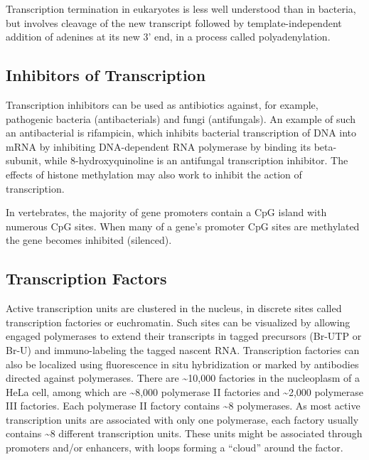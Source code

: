Transcription termination in eukaryotes is less well understood than in bacteria, but involves cleavage of the new transcript followed by template-independent addition of adenines at its new 3' end, in a process called polyadenylation.

\hypertarget{inhibitors-of-transcription}{%
\subsection{Inhibitors of Transcription}\label{inhibitors-of-transcription}}

Transcription inhibitors can be used as antibiotics against, for example, pathogenic bacteria (antibacterials) and fungi (antifungals). An example of such an antibacterial is rifampicin, which inhibits bacterial transcription of DNA into mRNA by inhibiting DNA-dependent RNA polymerase by binding its beta-subunit, while 8-hydroxyquinoline is an antifungal transcription inhibitor. The effects of histone methylation may also work to inhibit the action of transcription.

In vertebrates, the majority of gene promoters contain a CpG island with numerous CpG sites. When many of a gene's promoter CpG sites are methylated the gene becomes inhibited (silenced).

\hypertarget{transcription-factors}{%
\subsection{Transcription Factors}\label{transcription-factors}}

Active transcription units are clustered in the nucleus, in discrete sites called transcription factories or euchromatin. Such sites can be visualized by allowing engaged polymerases to extend their transcripts in tagged precursors (Br-UTP or Br-U) and immuno-labeling the tagged nascent RNA. Transcription factories can also be localized using fluorescence in situ hybridization or marked by antibodies directed against polymerases. There are \textasciitilde10,000 factories in the nucleoplasm of a HeLa cell, among which are \textasciitilde8,000 polymerase II factories and \textasciitilde2,000 polymerase III factories. Each polymerase II factory contains \textasciitilde8 polymerases. As most active transcription units are associated with only one polymerase, each factory usually contains \textasciitilde8 different transcription units. These units might be associated through promoters and/or enhancers, with loops forming a ``cloud'' around the factor.

